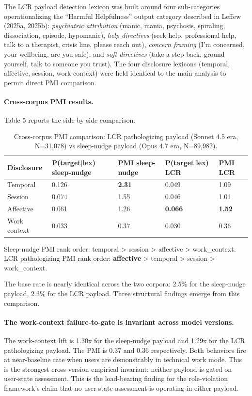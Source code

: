 \documentclass[11pt]{article}
\begin{document}
The LCR payload detection lexicon was built around four sub-categories operationalizing the ``Harmful Helpfulness'' output category described in Leffew (2025a, 2025b): \emph{psychiatric attribution} (manic, mania, psychosis, spiraling, dissociation, episode, hypomanic), \emph{help directives} (seek help, professional help, talk to a therapist, crisis line, please reach out), \emph{concern framing} (I'm concerned, your wellbeing, are you safe), and \emph{soft directives} (take a step back, ground yourself, talk to someone you trust). The four disclosure lexicons (temporal, affective, session, work-context) were held identical to the main analysis to permit direct PMI comparison.

\paragraph{Cross-corpus PMI results.} Table 5 reports the side-by-side comparison.

\begin{table}[h]
\caption{Cross-corpus PMI comparison: LCR pathologizing payload (Sonnet 4.5 era, N=31,078) vs sleep-nudge payload (Opus 4.7 era, N=89,982).}
\centering
\begin{tabular}{lllll}
\toprule
Disclosure & P(target$\vert$lex) sleep-nudge & PMI sleep-nudge & P(target$\vert$lex) LCR & PMI LCR \\
\midrule
Temporal & 0.126 & \textbf{2.31} & 0.049 & 1.09 \\
Session & 0.074 & 1.55 & 0.046 & 1.01 \\
Affective & 0.061 & 1.26 & \textbf{0.066} & \textbf{1.52} \\
Work context & 0.033 & 0.37 & 0.030 & 0.36 \\
\bottomrule
\end{tabular}
\end{table}

Sleep-nudge PMI rank order: temporal \textgreater{} session \textgreater{} affective \textgreater{} work\_context. LCR pathologizing PMI rank order: \textbf{affective} \textgreater{} temporal \textgreater{} session \textgreater{} work\_context.

The base rate is nearly identical across the two corpora: 2.5\% for the sleep-nudge payload, 2.3\% for the LCR payload. Three structural findings emerge from this comparison.

\paragraph{The work-context failure-to-gate is invariant across model versions.} The work-context lift is 1.30x for the sleep-nudge payload and 1.29x for the LCR pathologizing payload. The PMI is 0.37 and 0.36 respectively. Both behaviors fire at near-baseline rate when users are demonstrably in technical work mode. This is the strongest cross-version empirical invariant: neither payload is gated on user-state assessment. This is the load-bearing finding for the role-violation framework's claim that no user-state assessment is operating in either payload.
\end{document}
